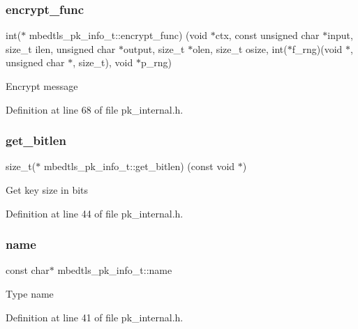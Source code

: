\subsubsection{\texorpdfstring{encrypt\+\_\+func}{encrypt\_func}}
{\footnotesize\ttfamily int($\ast$ mbedtls\+\_\+pk\+\_\+info\+\_\+t\+::encrypt\+\_\+func) (void $\ast$ctx, const unsigned char $\ast$input, size\+\_\+t ilen, unsigned char $\ast$output, size\+\_\+t $\ast$olen, size\+\_\+t osize, int($\ast$f\+\_\+rng)(void $\ast$, unsigned char $\ast$, size\+\_\+t), void $\ast$p\+\_\+rng)}

Encrypt message 

Definition at line 68 of file pk\+\_\+internal.\+h.

\mbox{\label{structmbedtls__pk__info__t_ab024ac521ddf1ea0837df0a88a0a4e19}} 
\subsubsection{\texorpdfstring{get\+\_\+bitlen}{get\_bitlen}}
{\footnotesize\ttfamily size\+\_\+t($\ast$ mbedtls\+\_\+pk\+\_\+info\+\_\+t\+::get\+\_\+bitlen) (const void $\ast$)}

Get key size in bits 

Definition at line 44 of file pk\+\_\+internal.\+h.

\mbox{\label{structmbedtls__pk__info__t_a6390c0e7c7597efec2033fcbea53697c}} 
\subsubsection{\texorpdfstring{name}{name}}
{\footnotesize\ttfamily const char$\ast$ mbedtls\+\_\+pk\+\_\+info\+\_\+t\+::name}

Type name 

Definition at line 41 of file pk\+\_\+internal.\+h.

\mbox{\label{structmbedtls__pk__info__t_a22d9de47693a6f2368d66d7d66db8093}} 
